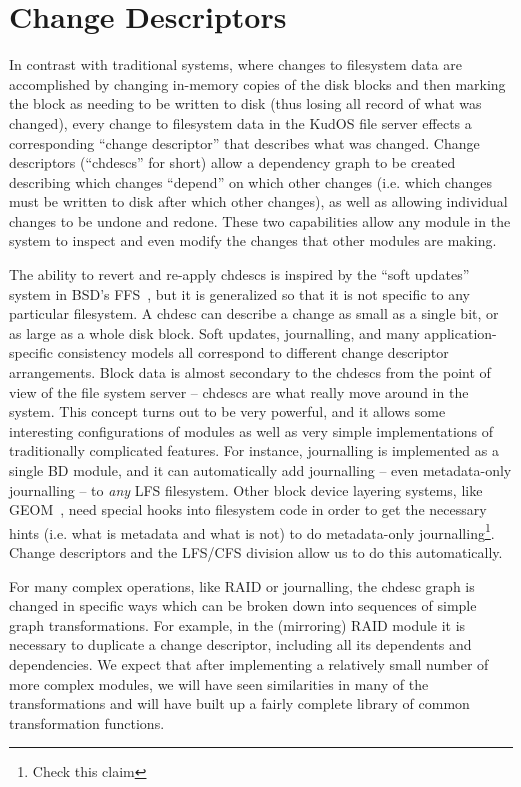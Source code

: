 \section{Change Descriptors}
\label{sec:chdescs}

In contrast with traditional systems, where changes to filesystem data are
accomplished by changing in-memory copies of the disk blocks and then marking
the block as needing to be written to disk (thus losing all record of what was
changed), every change to filesystem data in the KudOS file server effects a
corresponding ``change descriptor'' that describes what was changed. Change
descriptors (``chdescs'' for short) allow a dependency graph to be created
describing which changes ``depend'' on which other changes (i.e. which changes
must be written to disk after which other changes), as well as allowing
individual changes to be undone and redone. These two capabilities allow any
module in the system to inspect and even modify the changes that other modules
are making.

The ability to revert and re-apply chdescs is inspired by the ``soft updates''
system in BSD's FFS~\cite{ganger00soft}, but it is generalized so that it is not
specific to any particular filesystem. A chdesc can describe a change as small
as a single bit, or as large as a whole disk block. Soft updates, journalling,
and many application-specific consistency models all correspond to different
change descriptor arrangements. Block data is almost secondary to the chdescs
from the point of view of the file system server -- chdescs are what really move
around in the system. This concept turns out to be very powerful, and it allows
some interesting configurations of modules as well as very simple
implementations of traditionally complicated features. For instance, journalling
is implemented as a single BD module, and it can automatically add journalling
-- even metadata-only journalling -- to {\it any} LFS filesystem. Other block
device layering systems, like GEOM~\cite{geom}, need special hooks into
filesystem code in order to get the necessary hints (i.e. what is metadata and
what is not) to do metadata-only journalling\footnote{Check this claim}. Change
descriptors and the LFS/CFS division allow us to do this automatically.

For many complex operations, like RAID or journalling, the chdesc graph is
changed in specific ways which can be broken down into sequences of simple graph
transformations. For example, in the (mirroring) RAID module it is necessary to
duplicate a change descriptor, including all its dependents and dependencies. We
expect that after implementing a relatively small number of more complex
modules, we will have seen similarities in many of the transformations and will
have built up a fairly complete library of common transformation functions.

